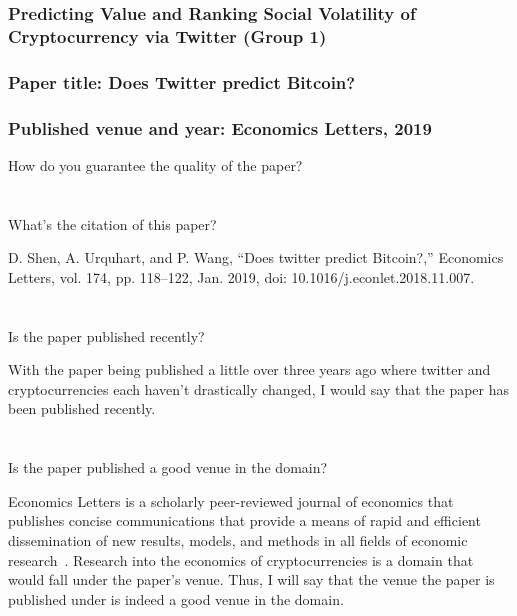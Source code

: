 \documentclass[
  coursecode={CMPE 351},
  assignmentname={Paper Review},
  studentnumber=20053722,
  name={Bryan Hoang (16bch1)},
  draft,
  final,
]{
  ltxanswer%
}
\begin{document}
  \section*{Predicting Value and Ranking Social Volatility of Cryptocurrency via Twitter (Group 1)}

  \section*{Paper title: Does Twitter predict Bitcoin?}

  \section*{Published venue and year: Economics Letters, 2019}

  \begin{questions}
    \question{} How do you guarantee the quality of the paper?
    \begin{parts}
      \part{} What's the citation of this paper?
      \begin{solution}
        D. Shen, A. Urquhart, and P. Wang, ``Does twitter predict Bitcoin?,'' Economics Letters, vol. 174, pp. 118--122, Jan. 2019, doi: 10.1016/j.econlet.2018.11.007.~\cite{shen_does_2019}
      \end{solution}

      \part{} Is the paper published recently?
      \begin{solution}
        With the paper being published a little over three years ago where twitter and cryptocurrencies each haven't drastically changed, I would say that the paper has been published recently.
      \end{solution}

      \part{} Is the paper published a good venue in the domain?
      \begin{solution}
        Economics Letters is a scholarly peer-reviewed journal of economics that publishes concise communications that provide a means of rapid and efficient dissemination of new results, models, and methods in all fields of economic research~\cite{noauthor_editorial_nodate}. Research into the economics of cryptocurrencies is a domain that would fall under the paper's venue. Thus, I will say that the venue the paper is published under is indeed a good venue in the domain.
      \end{solution}
    \end{parts}


\end{questions}
\end{document}
